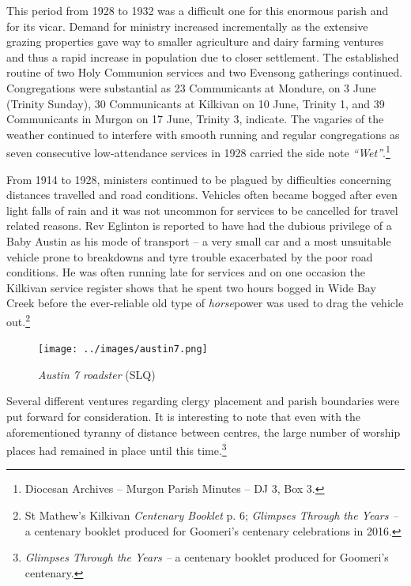This period from 1928 to 1932 was a difficult one for this enormous parish and for its vicar. Demand for ministry increased incrementally as the extensive grazing properties gave way to smaller agriculture and dairy farming ventures and thus a rapid increase in population due to closer settlement. The established routine of two Holy Communion services and two Evensong gatherings continued. Congregations were substantial as 23 Communicants at Mondure, on 3 June (Trinity Sunday), 30 Communicants at Kilkivan on 10 June, Trinity 1, and 39 Communicants in Murgon on 17 June, Trinity 3, indicate. The vagaries of the weather continued to interfere with smooth running and regular congregations as seven consecutive low-attendance services in 1928 carried the side note \emph{``Wet''}.\footnote{Diocesan Archives -- Murgon Parish Minutes -- DJ 3, Box 3.}


From 1914 to 1928, ministers continued to be plagued by difficulties concerning distances travelled and road conditions. Vehicles often became bogged after even light falls of rain and it was not uncommon for services to be cancelled for travel related reasons. Rev Eglinton is reported to have had the dubious privilege of a Baby Austin as his mode of transport -- a very small car and a most unsuitable vehicle prone to breakdowns and tyre trouble exacerbated by the poor road conditions. He was often running late for services and on one occasion the Kilkivan service register shows that he spent two hours bogged in Wide Bay Creek before the ever-reliable old type of \emph{horse}power was used to drag the vehicle out.\footnote{St Mathew's Kilkivan \emph{Centenary Booklet} p. 6; \emph{Glimpses Through the Years --} a centenary booklet produced for Goomeri's centenary celebrations in 2016.}








\begin{figure}[!htb]
\begin{center}
\texttt{[image: ../images/austin7.png]}
\caption{{\itshape Austin 7 roadster} {\scriptsize(SLQ)}}
\end{center}
\end{figure}




Several different ventures regarding clergy placement and parish boundaries were put forward for consideration. It is interesting to note that even with the aforementioned tyranny of distance between centres, the large number of worship places had remained in place until this time.\footnote{\emph{Glimpses Through the Years --} a centenary booklet produced for Goomeri's centenary.}


